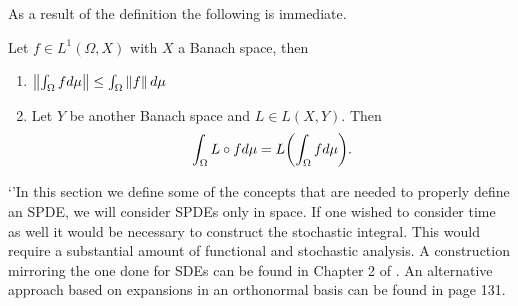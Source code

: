 \documentclass[
    a4paper,
    DIV=14,
    abstract=true,
    numbers=noenddot
]{scrartcl}
\begin{document}
As a result of the definition the following is immediate.
\begin{corollary}
	Let $f\in L^1(\Omega,X)$ with $X$ a Banach space, then
	\begin{enumerate}
		\item $\left\lVert \int_\Omega f d\mu \right\rVert\leq\int_\Omega{\left\lVert f \right\rVert d\mu} $
		\item Let $Y$ be another Banach space and $L\in L(X,Y)$. Then
		      \begin{equation*}
			      \int_\Omega L\circ f d\mu=L\qty(\int_\Omega f d\mu).
		      \end{equation*}
	\end{enumerate}
\end{corollary}
`'In this section we define some of the concepts that are needed to properly define an SPDE, we will consider SPDEs only in space. If one wished to consider time as well it would be necessary to construct the stochastic integral. This would require a substantial amount of functional and stochastic analysis. A construction mirroring the one done for SDEs can be found in Chapter 2 of \cite{liu2015stochastic}. An alternative approach based on expansions in an orthonormal basis can be found in \cite{lototsky2017stochastic} page 131.
\end{document}

